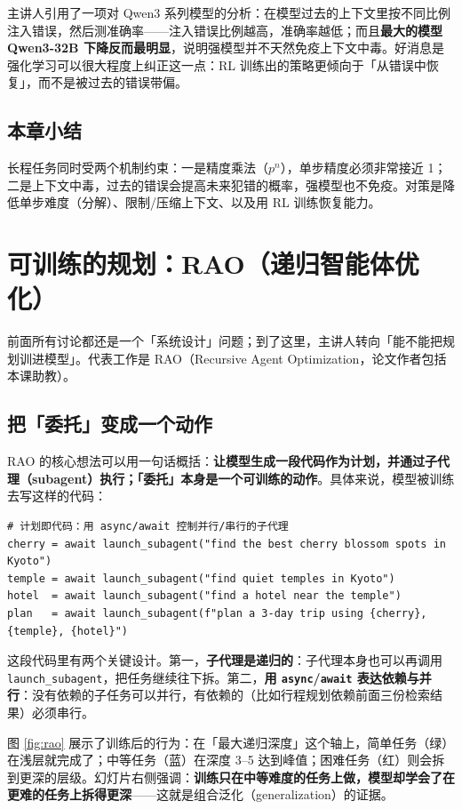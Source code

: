 \documentclass[a4paper]{article}
\begin{document}
主讲人引用了一项对 Qwen3 系列模型的分析：在模型过去的上下文里按不同比例注入错误，然后测准确率——注入错误比例越高，准确率越低；而且\textbf{最大的模型 Qwen3-32B 下降反而最明显}，说明强模型并不天然免疫上下文中毒。好消息是强化学习可以很大程度上纠正这一点：RL 训练出的策略更倾向于「从错误中恢复」，而不是被过去的错误带偏。

\subsection{本章小结}
长程任务同时受两个机制约束：一是精度乘法（$p^n$），单步精度必须非常接近 1；二是上下文中毒，过去的错误会提高未来犯错的概率，强模型也不免疫。对策是降低单步难度（分解）、限制/压缩上下文、以及用 RL 训练恢复能力。

\section{可训练的规划：RAO（递归智能体优化）}

前面所有讨论都还是一个「系统设计」问题；到了这里，主讲人转向「能不能把规划训进模型」。代表工作是 RAO（Recursive Agent Optimization，论文作者包括本课助教）。

\subsection{把「委托」变成一个动作}

RAO 的核心想法可以用一句话概括：\textbf{让模型生成一段代码作为计划，并通过子代理（subagent）执行；「委托」本身是一个可训练的动作}。具体来说，模型被训练去写这样的代码：

\begin{lstlisting}[caption={RAO 风格的计划：模型生成控制子代理的代码（示意，非原始实现）},label={lst:rao}]
# 计划即代码：用 async/await 控制并行/串行的子代理
cherry = await launch_subagent("find the best cherry blossom spots in Kyoto")
temple = await launch_subagent("find quiet temples in Kyoto")
hotel  = await launch_subagent("find a hotel near the temple")
plan   = await launch_subagent(f"plan a 3-day trip using {cherry}, {temple}, {hotel}")
\end{lstlisting}

这段代码里有两个关键设计。第一，\textbf{子代理是递归的}：子代理本身也可以再调用 \texttt{launch\_subagent}，把任务继续往下拆。第二，\textbf{用 \texttt{async}/\texttt{await} 表达依赖与并行}：没有依赖的子任务可以并行，有依赖的（比如行程规划依赖前面三份检索结果）必须串行。

图 \ref{fig:rao} 展示了训练后的行为：在「最大递归深度」这个轴上，简单任务（绿）在浅层就完成了；中等任务（蓝）在深度 3--5 达到峰值；困难任务（红）则会拆到更深的层级。幻灯片右侧强调：\textbf{训练只在中等难度的任务上做，模型却学会了在更难的任务上拆得更深}——这就是组合泛化（generalization）的证据。
\end{document}
